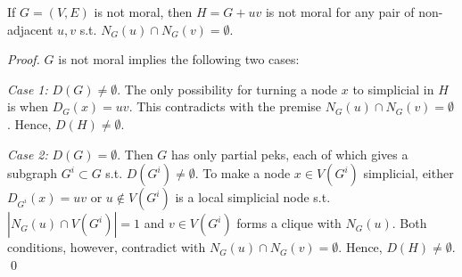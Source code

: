 \begin{lemma}
\label{lm:no_common_nbr}
If $G=(V,E)$ is not moral, then $H=G+uv$ is not moral for any pair of non-adjacent $u,v$ s.t. $N_G(u)\cap N_G(v)=\emptyset$. 
\end{lemma}
\begin{proof}
$G$ is not moral implies the following two cases:

\textit{Case 1:} $D(G)\neq \emptyset$. The only possibility for turning a node $x$ to simplicial in $H$ is when $D_G(x)=uv$. This contradicts with the premise $N_G(u)\cap N_G(v)=\emptyset$. Hence, $D(H)\neq \emptyset$.

\textit{Case 2:} $D(G)=\emptyset$. Then $G$ has only partial peks, each of which gives a subgraph $G^i \subset G$ s.t. $D(G^i)\neq \emptyset$. To make a node $x \in V(G^i)$ simplicial, either $D_{G^i}(x)=uv$ or $u \notin V(G^i)$ is a local simplicial node s.t. $|N_G(u) \cap V(G^i)| = 1$ and $v \in V(G^i)$ forms a clique with $N_G(u)$. Both conditions, however, contradict with $N_G(u)\cap N_G(v)=\emptyset$. Hence, $D(H)\neq \emptyset$. \qed
\end{proof}

